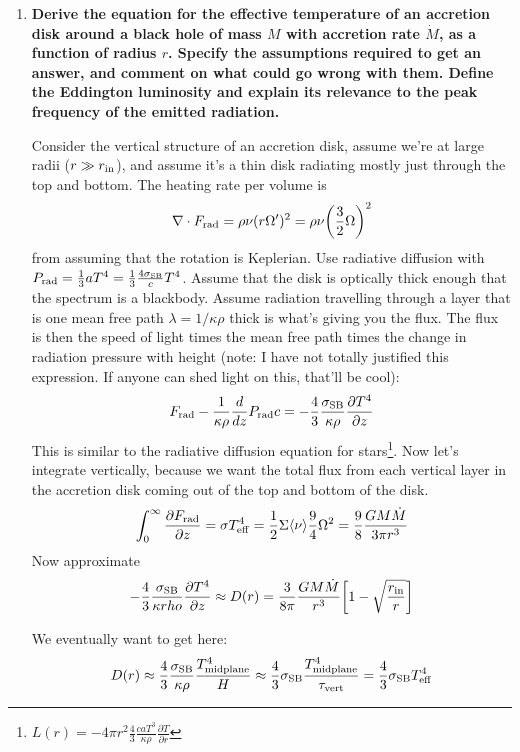 \begin{enumerate}
\item \textbf{Derive the equation for the effective temperature of an accretion disk around a
      black hole of mass $M$ with accretion rate $\dot M$, as a function of radius $r$. Specify the
      assumptions required to get an answer, and comment on what could go wrong with
      them. Define the Eddington luminosity and explain its relevance to the peak frequency
      of the emitted radiation.}
      
      Consider the vertical structure of an accretion disk, assume we're at large radii ($r \gg r_{\rm in}$), and assume it's a thin disk radiating mostly just through the top and bottom. The heating rate per volume is
      \begin{equation}
      \nabla \cdot F_{\rm rad} = \rho \nu (r \Omega^\prime)^2 = \rho \nu \biggl(\frac{3}{2} \Omega \biggr)^2
      \end{equation}
      from assuming that the rotation is Keplerian. Use radiative diffusion with $P_{\rm rad} = \frac{1}{3} a T^4 = \frac{1}{3}\frac{4 \sigma_{\rm SB}}{c}T^4$. Assume that the disk is optically thick enough that the spectrum is a blackbody. Assume radiation travelling through a layer that is one mean free path $\lambda = 1/\kappa \rho$ thick is what's giving you the flux. The flux is then the speed of light times the mean free path times the change in radiation pressure with height (note: I have not totally justified this expression. If anyone can shed light on this, that'll be cool):
      \begin{equation}
      F_{\rm rad} - \frac{1}{\kappa \rho} \frac{d}{dz}P_{\rm rad} c = -\frac{4}{3}\frac{\sigma_{\rm SB}}{\kappa \rho}\frac{\partial T^4}{\partial z}
      \end{equation}
      This is similar to the radiative diffusion equation for stars\footnote{$L(r) = -4 \pi r^2 \frac{4}{3} \frac{c a T^3}{\kappa\rho}\frac{\partial T}{\partial r}$}. Now let's integrate vertically, because we want the total flux from each vertical layer in the accretion disk coming out of the top and bottom of the disk.
      \begin{equation}
      \int^\infty_0 \frac{\partial F_{\rm rad}}{\partial z} = \sigma T_{\rm eff}^4 = \frac{1}{2} \Sigma \langle \nu \rangle \frac{9}{4}\Omega^2 = \frac{9}{8} \frac{G M \dot{M}}{3 \pi r^3}
      \end{equation}
      Now approximate 
      \begin{equation}
      -\frac{4}{3} \frac{\sigma_{\rm SB}}{\kappa rho} \frac{\partial T^4}{\partial z} \approx D(r) = \frac{3}{8 \pi}\frac{GM\dot{M}}{r^3}\biggl[1 - \sqrt{\frac{r_{\rm in}}{r}} \biggr]
      \end{equation}
      
      We eventually want to get here:
      \begin{equation}
      D(r) \approx \frac{4}{3}\frac{\sigma_{\rm SB}}{\kappa \rho}\frac{T^4_{\rm midplane}}{H} \approx \frac{4}{3}\sigma_{\rm SB}\frac{T^4_{\rm midplane}}{\tau_{\rm vert}} = \frac{4}{3}\sigma_{\rm SB}T^4_{\rm eff}
      \end{equation}
      
      
\end{enumerate}

